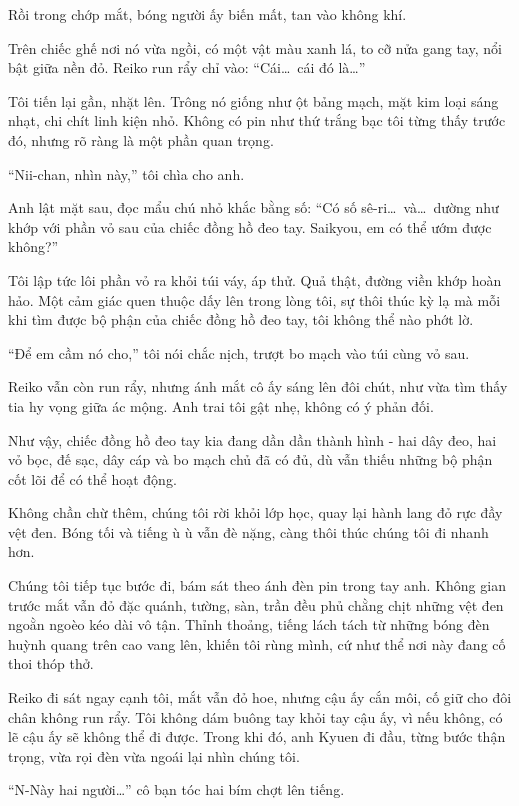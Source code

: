 \documentclass[../main.tex]{subfiles}
\begin{document}
Rồi trong chớp mắt, bóng người ấy biến mất, tan vào không khí.

Trên chiếc ghế nơi nó vừa ngồi, có một vật màu xanh lá, to cỡ nửa gang tay, nổi bật giữa nền đỏ. Reiko run rẩy chỉ vào: ``Cái\dots\ cái đó là\dots''

Tôi tiến lại gần, nhặt lên. Trông nó giống như ột bảng mạch, mặt kim loại sáng nhạt, chi chít linh kiện nhỏ. Không có pin như thứ trắng bạc tôi từng thấy trước đó, nhưng rõ ràng là một phần quan trọng.

``Nii-chan, nhìn này,'' tôi chìa cho anh.

Anh lật mặt sau, đọc mẩu chú nhỏ khắc bằng số: ``Có số sê-ri\dots\ và\dots\ dường như khớp với phần vỏ sau của chiếc đồng hồ đeo tay. Saikyou, em có thể ướm được không?''

Tôi lập tức lôi phần vỏ ra khỏi túi váy, áp thử. Quả thật, đường viền khớp hoàn hảo. Một cảm giác quen thuộc dấy lên trong lòng tôi, sự thôi thúc kỳ lạ mà mỗi khi tìm được bộ phận của chiếc đồng hồ đeo tay, tôi không thể nào phớt lờ.

``Để em cầm nó cho,'' tôi nói chắc nịch, trượt bo mạch vào túi cùng vỏ sau.

Reiko vẫn còn run rẩy, nhưng ánh mắt cô ấy sáng lên đôi chút, như vừa tìm thấy tia hy vọng giữa ác mộng. Anh trai tôi gật nhẹ, không có ý phản đối.

Như vậy, chiếc đồng hồ đeo tay kia đang dần dần thành hình - hai dây đeo, hai vỏ bọc, đế sạc, dây cáp và bo mạch chủ đã có đủ, dù vẫn thiếu những bộ phận cốt lõi để có thể hoạt động.

Không chần chừ thêm, chúng tôi rời khỏi lớp học, quay lại hành lang đỏ rực đầy vệt đen. Bóng tối và tiếng ù ù vẫn đè nặng, càng thôi thúc chúng tôi đi nhanh hơn.

\ct

Chúng tôi tiếp tục bước đi, bám sát theo ánh đèn pin trong tay anh. Không gian trước mắt vẫn đỏ đặc quánh, tường, sàn, trần đều phủ chằng chịt những vệt đen ngoằn ngoèo kéo dài vô tận. Thỉnh thoảng, tiếng lách tách từ những bóng đèn huỳnh quang trên cao vang lên, khiến tôi rùng mình, cứ như thể nơi này đang cố thoi thóp thở.

Reiko đi sát ngay cạnh tôi, mắt vẫn đỏ hoe, nhưng cậu ấy cắn môi, cố giữ cho đôi chân không run rẩy. Tôi không dám buông tay khỏi tay cậu ấy, vì nếu không, có lẽ cậu ấy sẽ không thể đi được. Trong khi đó, anh Kyuen đi đầu, từng bước thận trọng, vừa rọi đèn vừa ngoái lại nhìn chúng tôi.

``N-Này hai người\dots'' cô bạn tóc hai bím chợt lên tiếng.
\end{document}
